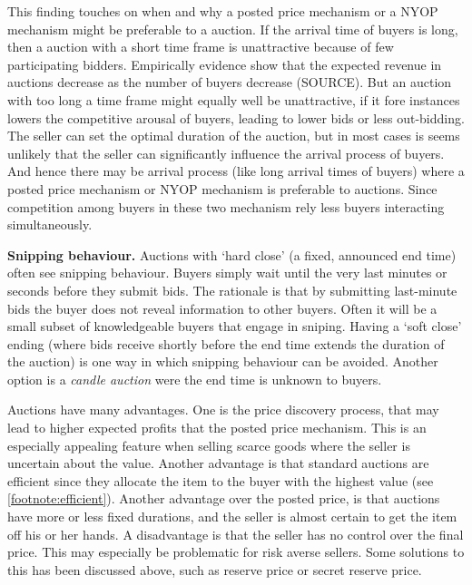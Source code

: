 \documentclass[a4paper,12pt]{article}
\begin{document}
This finding touches on when and why a posted price mechanism or a NYOP mechanism might be preferable to a auction. If the arrival time of buyers is long, then a auction with a short time frame is unattractive because of few participating bidders. Empirically evidence show that the expected revenue in auctions decrease as the number of buyers decrease (SOURCE). But an auction with too long a time frame might equally well be unattractive, if it fore instances lowers the competitive arousal of buyers, leading to lower bids or less out-bidding. The seller can set the optimal duration of the auction, but in most cases is seems unlikely that the seller can significantly influence the arrival process of buyers. And hence there may be arrival process (like long arrival times of buyers) where a posted price mechanism or NYOP mechanism is preferable to auctions. Since competition among buyers in these two mechanism rely less buyers interacting simultaneously.

	{\bf Snipping behaviour.} Auctions with `hard close' (a fixed, announced end time) often see snipping behaviour. Buyers simply wait until the very last minutes or seconds before they submit bids. The rationale is that by submitting last-minute bids the buyer does not reveal information to other buyers. Often it will be a small subset of knowledgeable buyers that engage in sniping. Having a `soft close' ending (where bids receive shortly before the end time extends the duration of the auction) is one way in which snipping behaviour can be avoided. Another option is a \emph{candle auction} were the end time is unknown to buyers. %

	Auctions have many advantages. One is the price discovery process, that may lead to higher expected profits that the posted price mechanism. This is an especially appealing feature when selling scarce goods where the seller is uncertain about the value. Another advantage is that standard auctions are efficient since they allocate the item to the buyer with the highest value (see \ref{footnote:efficient}). Another advantage over the posted price, is that auctions have more or less fixed durations, and the seller is almost certain to get the item off his or her hands. A disadvantage is that the seller has no control over the final price. This may especially be problematic for risk averse sellers. Some solutions to this has been discussed above, such as reserve price or secret reserve price.
\end{document}
